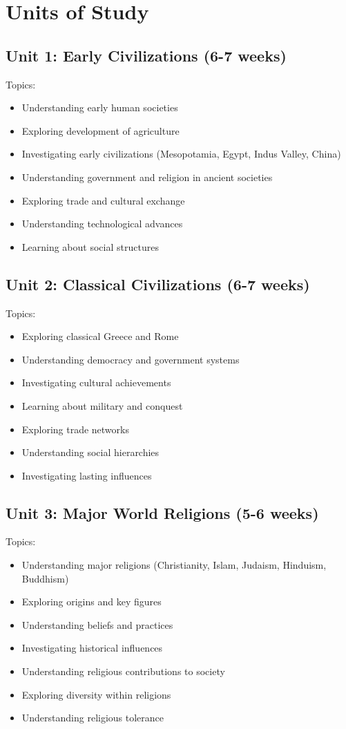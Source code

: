 \documentclass[11pt,letterpaper]{report}
\begin{document}
\section{Units of Study}

\subsection{Unit 1: Early Civilizations (6-7 weeks)}

Topics:
\begin{itemize}
\item Understanding early human societies
\item Exploring development of agriculture
\item Investigating early civilizations (Mesopotamia, Egypt, Indus Valley, China)
\item Understanding government and religion in ancient societies
\item Exploring trade and cultural exchange
\item Understanding technological advances
\item Learning about social structures
\end{itemize}

\subsection{Unit 2: Classical Civilizations (6-7 weeks)}

Topics:
\begin{itemize}
\item Exploring classical Greece and Rome
\item Understanding democracy and government systems
\item Investigating cultural achievements
\item Learning about military and conquest
\item Exploring trade networks
\item Understanding social hierarchies
\item Investigating lasting influences
\end{itemize}

\subsection{Unit 3: Major World Religions (5-6 weeks)}

Topics:
\begin{itemize}
\item Understanding major religions (Christianity, Islam, Judaism, Hinduism, Buddhism)
\item Exploring origins and key figures
\item Understanding beliefs and practices
\item Investigating historical influences
\item Understanding religious contributions to society
\item Exploring diversity within religions
\item Understanding religious tolerance
\end{itemize}
\end{document}

